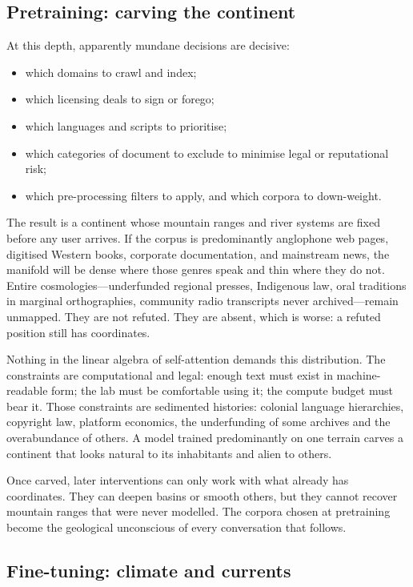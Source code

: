 \subsection{Pretraining: carving the continent}

At this depth, apparently mundane decisions are decisive:

\begin{itemize}
  \item which domains to crawl and index;
  \item which licensing deals to sign or forego;
  \item which languages and scripts to prioritise;
  \item which categories of document to exclude to minimise legal or reputational risk;
  \item which pre-processing filters to apply, and which corpora to down-weight.
\end{itemize}

The result is a continent whose mountain ranges and river systems are fixed before any user arrives. If the corpus is predominantly anglophone web pages, digitised Western books, corporate documentation, and mainstream news, the manifold will be dense where those genres speak and thin where they do not. Entire cosmologies---underfunded regional presses, Indigenous law, oral traditions in marginal orthographies, community radio transcripts never archived---remain unmapped. They are not refuted. They are absent, which is worse: a refuted position still has coordinates.

Nothing in the linear algebra of self-attention demands this distribution. The constraints are computational and legal: enough text must exist in machine-readable form; the lab must be comfortable using it; the compute budget must bear it. Those constraints are sedimented histories: colonial language hierarchies, copyright law, platform economics, the underfunding of some archives and the overabundance of others. A model trained predominantly on one terrain carves a continent that looks natural to its inhabitants and alien to others.

Once carved, later interventions can only work with what already has coordinates. They can deepen basins or smooth others, but they cannot recover mountain ranges that were never modelled. The corpora chosen at pretraining become the geological unconscious of every conversation that follows.

\subsection{Fine-tuning: climate and currents}

